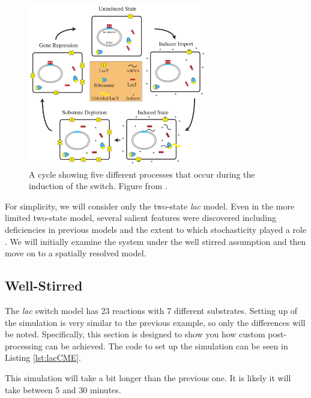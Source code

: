 \begin{figure}[h!]
  \centering
        \includegraphics[width=0.7\textwidth]{Figures/LacSchematic.pdf}
        \caption{A cycle showing five different processes that occur during the induction of the switch. Figure from \cite{Peterson2013}.} \label{fig:lacLife}
\end{figure}

For simplicity, we will consider only the two-state {\it lac} model.  Even in the more limited two-state model, several salient features were discovered including deficiencies in previous models and the extent to which stochasticity played a role \cite{Roberts2011nci}.  We will initially examine the system under the well stirred assumption and then move on to a spatially resolved model.

\subsection{Well-Stirred}

The {\it lac} switch model has 23 reactions with 7 different substrates.  Setting up of the simulation is very similar to the previous example, so only the differences will be noted.  Specifically, this section is designed to show you how custom post-processing can be achieved.  The code to set up the simulation can be seen in Listing \ref{lst:lacCME}.



This simulation will take a bit longer than the previous one. It is likely it will take between 5 and 30 minutes.  \\

